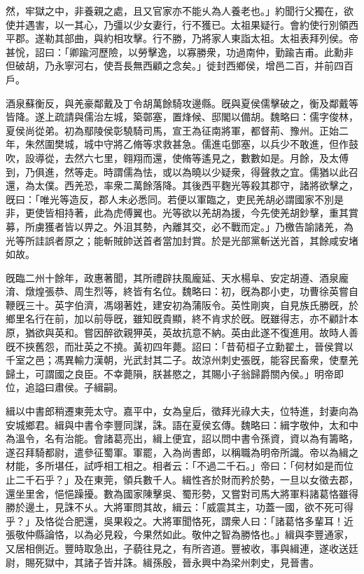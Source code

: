 \begin{pinyinscope}
然，牢獄之中，非養親之處，且又官家亦不能乆為人養老也。」約聞行父獨在，欲使并遇害，以一其心，乃彊以少女妻行，行不獲已。太祖果疑行。會約使行別領西平郡。遂勒其部曲，與約相攻擊。行不勝，乃將家人東詣太祖。太祖表拜列侯。帝甚恱，詔曰：「卿踰河歷險，以勞擊逸，以寡勝衆，功過南仲，勤踰吉甫。此勳非但破胡，乃永寧河右，使吾長無西顧之念矣。」徙封西鄉侯，增邑二百，并前四百戶。

酒泉蘇衡反，與羌豪鄰戴及丁令胡萬餘騎攻邊縣。旣與夏侯儒擊破之，衡及鄰戴等皆降。遂上疏請與儒治左城，築鄣塞，置烽候、邸閣以備胡。魏略曰：儒字俊林，夏侯尚從弟。初為鄢陵侯彰驍騎司馬，宣王為征南將軍，都督荊、豫州。正始二年，朱然圍樊城，城中守將乙脩等求救甚急。儒進屯鄧塞，以兵少不敢進，但作鼓吹，設導從，去然六七里，翱翔而還，使脩等遙見之，數數如是。月餘，及太傅到，乃俱進，然等走。時謂儒為怯，或以為曉以少疑衆，得聲救之宜。儒猶以此召還，為太僕。西羌恐，率衆二萬餘落降。其後西平麴光等殺其郡守，諸將欲擊之，旣曰：「唯光等造反，郡人未必悉同。若便以軍臨之，吏民羌胡必謂國家不別是非，更使皆相持著，此為虎傅翼也。光等欲以羌胡為援，今先使羌胡鈔擊，重其賞募，所虜獲者皆以畀之。外沮其勢，內離其交，必不戰而定。」乃檄告諭諸羌，為光等所詿誤者原之；能斬賊帥送首者當加封賞。於是光部黨斬送光首，其餘咸安堵如故。

旣臨二州十餘年，政惠著聞，其所禮辟扶風龐延、天水楊阜、安定胡遵、酒泉龐淯、燉煌張恭、周生烈等，終皆有名位。魏略曰：初，旣為郡小吏，功曹徐英嘗自鞭旣三十。英字伯濟，馮翊著姓，建安初為蒲阪令。英性剛爽，自見族氏勝旣，於鄉里名行在前，加以前辱旣，雖知旣貴顯，終不肯求於旣。旣雖得志，亦不顧計本原，猶欲與英和。嘗因醉欲親狎英，英故抗意不納。英由此遂不復進用。故時人善旣不挾舊怨，而壯英之不撓。黃初四年薨。詔曰：「昔荀桓子立勳翟土，晉侯賞以千室之邑；馮異輸力漢朝，光武封其二子。故涼州刺史張旣，能容民畜衆，使羣羌歸土，可謂國之良臣。不幸薨隕，朕甚愍之，其賜小子翁歸爵關內侯。」明帝即位，追謚曰肅侯。子緝嗣。

緝以中書郎稍遷東莞太守。嘉平中，女為皇后，徵拜光祿大夫，位特進，封妻向為安城鄉君。緝與中書令李豐同謀，誅。語在夏侯玄傳。魏略曰：緝字敬仲，太和中為溫令，名有治能。會諸葛亮出，緝上便宜，詔以問中書令孫資，資以為有籌略，遂召拜騎都尉，遣參征蜀軍。軍罷，入為尚書郎，以稱職為明帝所識。帝以為緝之材能，多所堪任，試呼相工相之。相者云：「不過二千石。」帝曰：「何材如是而位止二千石乎？」及在東莞，領兵數千人。緝性吝於財而矜於勢，一旦以女徵去郡，還坐里舍，悒悒躁擾。數為國家陳擊吳、蜀形勢，又嘗對司馬大將軍料諸葛恪雖得勝於邊土，見誅不乆。大將軍問其故，緝云：「威震其主，功蓋一國，欲不死可得乎？」及恪從合肥還，吳果殺之。大將軍聞恪死，謂衆人曰：「諸葛恪多輩耳！近張敬仲縣論恪，以為必見殺，今果然如此。敬仲之智為勝恪也。」緝與李豐通家，又居相側近。豐時取急出，子藐往見之，有所咨道。豐被收，事與緝連，遂收送廷尉，賜死獄中，其諸子皆并誅。緝孫殷，晉永興中為梁州刺史，見晉書。


\end{pinyinscope}